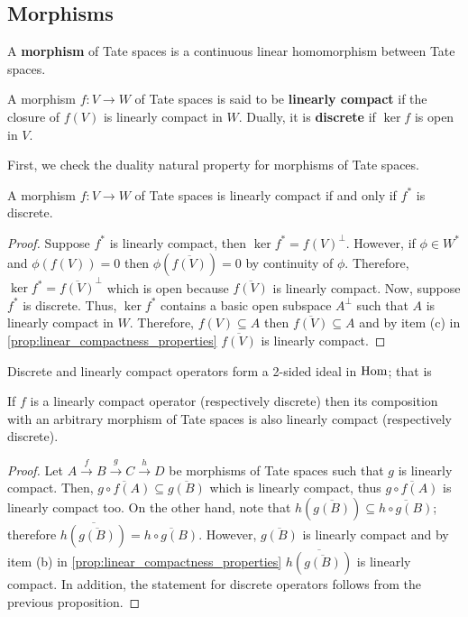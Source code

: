 \subsection*{Morphisms}
A \textbf{morphism} of Tate spaces is a continuous linear homomorphism between Tate spaces.
\begin{definition}\label{def:linearly-compact-and-discrete-morphisms}
	A morphism $f\colon V\to W$ of Tate spaces is said to be \textbf{linearly compact} if the closure of $f(V)$ is linearly compact in $W$. Dually, it is \textbf{discrete} if $\ker f$ is open in $V$. 
\end{definition}
First, we check the duality natural property for morphisms of Tate spaces.
\begin{proposition}\label{prop:duality-discrete-compact-maps}
	A morphism $f\colon V\to W$ of Tate spaces is linearly compact if and only if $f^{*}$ is discrete.
\end{proposition}
\begin{proof}
	Suppose $f^{*}$ is linearly compact, then $\ker f^{*} = f(V)^{\perp}$. However, if $\phi\in W^{*}$ and $\phi(f(V)) = 0$ then $\phi(\overline{f(V)}) = 0$ by continuity of $\phi$. Therefore, $\ker f^{*} = \overline{f(V)}^{\perp}$ which is open because $\overline{f(V)}$ is linearly compact. Now, suppose $f^{*}$ is discrete. Thus, $\ker f^{*}$ contains a basic open subspace $A^{\perp}$ such that $A$ is linearly compact in $W$. Therefore, $f(V)\subseteq A$ then $\overline{f(V)} \subseteq A$ and by item (c) in \cref{prop:linear_compactness_properties} $\overline{f(V)}$ is linearly compact.
\end{proof}
Discrete and linearly compact operators form a 2-sided ideal in $\operatorname{Hom}$; that is
\begin{proposition}\label{prop:compact-and-discrete-2-sided-ideal}
	If $f$ is a linearly compact operator (respectively discrete) then its composition with an arbitrary morphism of Tate spaces is also linearly compact (respectively discrete). 
\end{proposition}
\begin{proof}
	Let $A \xrightarrow{f} B \xrightarrow{g} C \xrightarrow{h} D$ be morphisms of Tate spaces such that $g$ is linearly compact. Then, $\overline{g\circ f(A)} \subseteq \overline{g(B)}$ which is linearly compact, thus $\overline{g\circ f(A)}$ is linearly compact too. On the other hand, note that $h(\overline{g(B)}) \subseteq \overline{h\circ g(B)}$; therefore $\overline{h(\overline{g(B)})} = \overline{h\circ g(B)}$. However, $\overline{g(B)}$ is linearly compact and by item (b) in \cref{prop:linear_compactness_properties} $\overline{h(\overline{g(B)})}$ is linearly compact. In addition, the statement for discrete operators follows from the previous proposition.
\end{proof}
